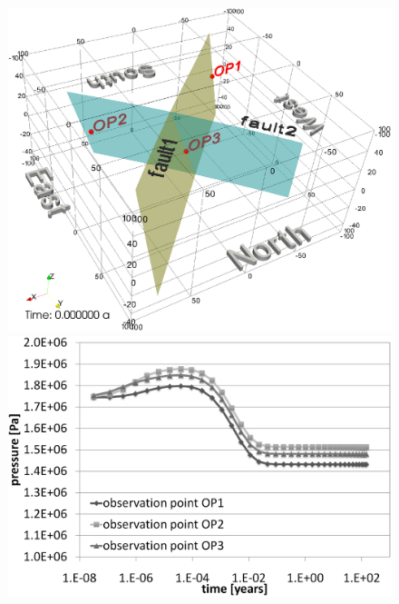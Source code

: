 \begin{figure}[htbp]
    \begin{center}
        \begin{minipage}{0.40\textwidth}
            \includegraphics[width=1\textwidth]{T/figures/2u2f_fig6a.eps}
        \end{minipage}
        \begin{minipage}{0.40\textwidth}
            \includegraphics[width=1\textwidth]{T/figures/2u2f_fig6b.eps}
        \end{minipage}
        \begin{minipage}{0.40\textwidth}

\end{minipage}
\end{center}
\end{figure}
